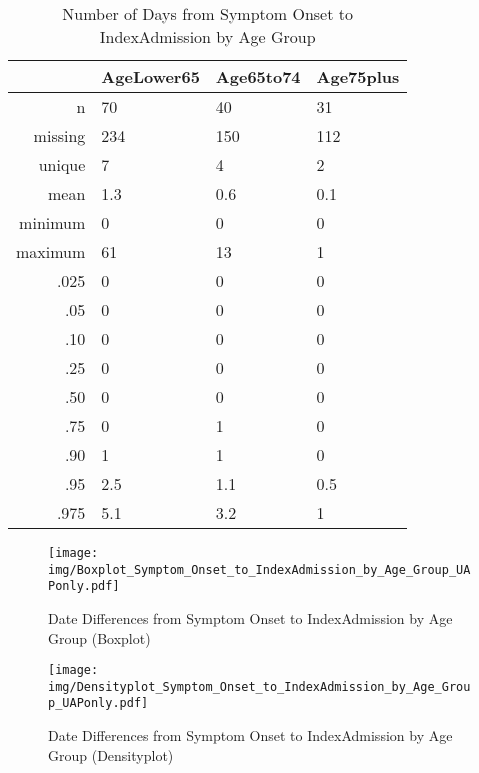 \documentclass[a4paper]{report}
\begin{document}
\begin{itemize}
{%
\begin{table}[ht]
\centering
\begin{tabular}{rlll}
  \toprule
 & AgeLower65 & Age65to74 & Age75plus \\ 
  \midrule
n & 70 & 40 & 31 \\ 
  missing & 234 & 150 & 112 \\ 
  unique & 7 & 4 & 2 \\ 
  mean & 1.3 & 0.6 & 0.1 \\ 
  minimum & 0 & 0 & 0 \\ 
  maximum & 61 & 13 & 1 \\ 
  .025 & 0 & 0 & 0 \\ 
  .05 & 0 & 0 & 0 \\ 
  .10 & 0 & 0 & 0 \\ 
  .25 & 0 & 0 & 0 \\ 
  .50 & 0 & 0 & 0 \\ 
  .75 & 0 & 1 & 0 \\ 
  .90 & 1 & 1 & 0 \\ 
  .95 & 2.5 & 1.1 & 0.5 \\ 
  .975 & 5.1 & 3.2 & 1 \\ 
   \bottomrule
\end{tabular}
\caption{Number of Days from Symptom Onset to IndexAdmission by Age Group} 
\end{table}
\begin{figure}
  \centering
  \caption{Date Differences from Symptom Onset to IndexAdmission by Age Group (Boxplot)}
  \label{Boxplot: Date Differences from Symptom Onset to IndexAdmission by Age Group}
\texttt{[image: img/Boxplot\_Symptom\_Onset\_to\_IndexAdmission\_by\_Age\_Group\_UAPonly.pdf]}\end{figure}


\begin{figure}
  \centering
  \caption{Date Differences from Symptom Onset to IndexAdmission by Age Group (Densityplot)}
  \label{Density: Date Differences from Symptom Onset to IndexAdmission by Age Group}
\texttt{[image: img/Densityplot\_Symptom\_Onset\_to\_IndexAdmission\_by\_Age\_Group\_UAPonly.pdf]}\end{figure}


\clearpage

}
\end{itemize}
\end{document}
